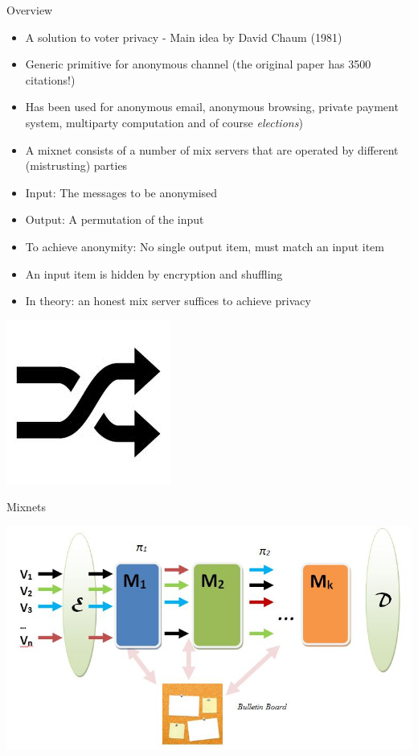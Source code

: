 \documentclass{beamer}
\begin{document}
\begin{frame}{Overview}
\begin{itemize}
\item A solution to voter privacy - Main idea by David Chaum (1981)
\item Generic primitive for anonymous channel (the original paper has 3500 citations!)
\item Has been used for anonymous email, anonymous browsing, private payment system, multiparty computation and of course \textit{elections})
\item A mixnet consists of a number of mix servers that are operated by different (mistrusting) parties
\item Input: The messages to be anonymised
\item Output: A permutation of the input
\item To achieve anonymity: No single output item, must match an input item
\item An input item is hidden by encryption and shuffling
\item In theory: an honest mix server suffices to achieve privacy
\end{itemize}
\begin{center}
\includegraphics[scale=0.3]{shuffle.jpg}
\end{center}
\end{frame} 

\begin{frame}{Mixnets}
\begin{center}
\includegraphics[scale=0.4]{mix.jpg}
\end{center}
\end{frame} 
\end{document}
